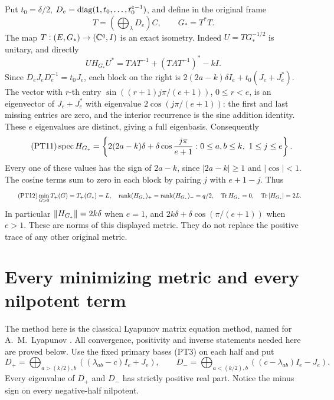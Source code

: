 Put \(t_0=\delta/2\), \(D_e=\operatorname{diag}(1,t_0,\ldots,t_0^{e-1})\),
and define in the original frame
\begin{equation}\tag{PT10}
 T=\left(\bigoplus_\lambda D_e\right)C,\qquad G_*=T^*T.
\end{equation}
The map \(T:(E,G_*)\to(\mathbb C^q,I)\) is an exact isometry.
Indeed \(U=TG_*^{-1/2}\) is unitary, and directly
\[
 UH_{G_*}U^*=TAT^{-1}+(TAT^{-1})^*-kI.
\]
Since \(D_eJ_eD_e^{-1}=t_0J_e\), each block on the right is
\(2(2a-k)\delta I_e+t_0(J_e+J_e^*)\). The vector with
\(r\)-th entry \(\sin((r+1)j\pi/(e+1))\), \(0\le r<e\),
is an eigenvector of \(J_e+J_e^*\) with eigenvalue
\(2\cos(j\pi/(e+1))\): the first and last missing entries are
zero, and the interior recurrence is the sine addition identity.
These \(e\) eigenvalues are distinct, giving a full eigenbasis.
Consequently
\begin{equation}\tag{PT11}
 \operatorname{spec} H_{G_*}
 =\left\{2(2a-k)\delta+\delta\cos\frac{j\pi}{e+1}:
 0\le a,b\le k,\ 1\le j\le e\right\}.
\end{equation}
Every one of these values has the sign of \(2a-k\), since
\(|2a-k|\ge1\) and \(|\cos|<1\). The cosine terms sum to
zero in each block by pairing \(j\) with \(e+1-j\). Thus
\begin{equation}\tag{PT12}
 \min_{G>0}T_+(G)=T_+(G_*)=L,\quad
 \operatorname{rank}(H_{G_*})_+=\operatorname{rank}(H_{G_*})_-=q/2,\quad
 \operatorname{Tr} H_{G_*}=0,\quad\operatorname{Tr}|H_{G_*}|=2L.
\end{equation}
In particular \(\left\lVert H_{G_*}\right\rVert=2k\delta\) when \(e=1\),
and \(2k\delta+\delta\cos(\pi/(e+1))\) when \(e>1\).
These are norms of this displayed metric. They do not replace
the positive trace of any other original metric.

\section{Every minimizing metric and every nilpotent term}

The method here is the classical Lyapunov matrix equation method,
named for A.~M.~Lyapunov \cite{a03pt:lyapunov}. All convergence,
positivity and inverse statements needed here are proved below.
Use the fixed primary bases (PT3) on each half and put
\begin{equation}\tag{PT13}
 D_+=\bigoplus_{a>(k/2),b}( (\lambda_{ab}-c)I_e+J_e),\qquad
 D_-=\bigoplus_{a<(k/2),b}( (c-\lambda_{ab})I_e-J_e).
\end{equation}
Every eigenvalue of \(D_+\) and \(D_-\) has strictly positive
real part. Notice the minus sign on every negative-half nilpotent.

